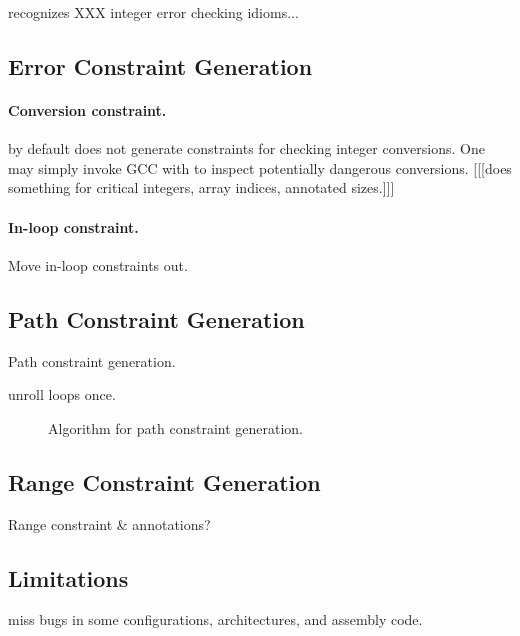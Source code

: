 \sys recognizes XXX integer error checking idioms...

\subsection{Error Constraint Generation}

\paragraph{Conversion constraint.}
\sys by default does not generate constraints for checking integer
conversions.  One may simply invoke GCC with  to
inspect potentially dangerous conversions.
[[[\sys does something for critical integers, array indices, annotated sizes.]]]

\paragraph{In-loop constraint.}
Move in-loop constraints out.

\subsection{Path Constraint Generation}

Path constraint generation.

unroll loops once.

\begin{figure}

\caption{Algorithm for path constraint generation.}
\label{f:path-cstr}
\end{figure}

\subsection{Range Constraint Generation}

Range constraint \& annotations?

\subsection{Limitations}

miss bugs in some configurations, architectures,
and assembly code.
